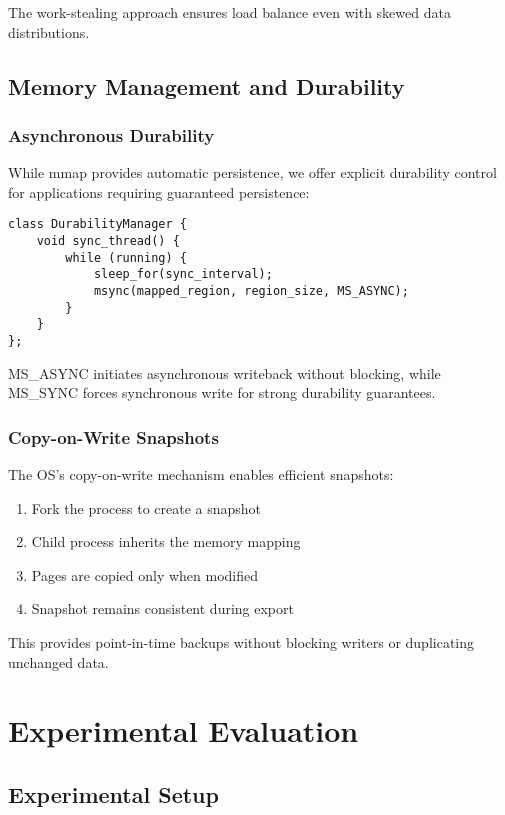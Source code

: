 \documentclass[10pt,conference]{IEEEtran}
\begin{document}
The work-stealing approach ensures load balance even with skewed data distributions.

\subsection{Memory Management and Durability}

\subsubsection{Asynchronous Durability}
While mmap provides automatic persistence, we offer explicit durability control for applications requiring guaranteed persistence:

\begin{lstlisting}[caption={Durability manager implementation},label={lst:durability}]
class DurabilityManager {
    void sync_thread() {
        while (running) {
            sleep_for(sync_interval);
            msync(mapped_region, region_size, MS_ASYNC);
        }
    }
};
\end{lstlisting}

MS\_ASYNC initiates asynchronous writeback without blocking, while MS\_SYNC forces synchronous write for strong durability guarantees.

\subsubsection{Copy-on-Write Snapshots}
The OS's copy-on-write mechanism enables efficient snapshots:
\begin{enumerate}
\item Fork the process to create a snapshot
\item Child process inherits the memory mapping
\item Pages are copied only when modified
\item Snapshot remains consistent during export
\end{enumerate}

This provides point-in-time backups without blocking writers or duplicating unchanged data.

\section{Experimental Evaluation}
\label{sec:evaluation}

\subsection{Experimental Setup}
\end{document}
